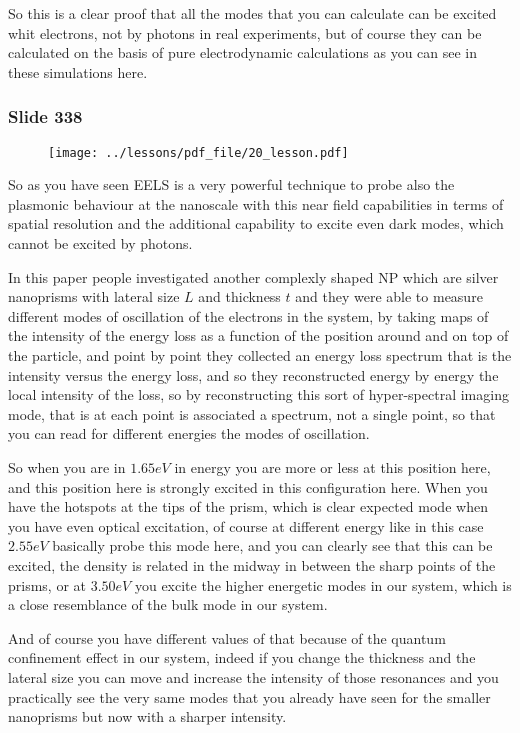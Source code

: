 \documentclass[../main/main.tex]{subfiles}
\begin{document}
So this is a clear proof that all the modes that you can calculate can be excited whit electrons, not by photons in real experiments, but of course they can be calculated on the basis of pure electrodynamic calculations as you can see in these simulations here.

\newpage

\subsubsection{Slide 338}

\begin{figure}[h!]
\centering
\texttt{[image: ../lessons/pdf\_file/20\_lesson.pdf]}
\end{figure}

So as you have seen EELS is a very powerful technique to probe also the plasmonic behaviour at the nanoscale with this near field capabilities in terms of spatial resolution and the additional capability to excite even dark modes, which cannot be excited by photons. 

In this paper people investigated another complexly shaped NP which are silver nanoprisms with lateral size $L$ and thickness $t$ and they were able to measure different modes of oscillation of the electrons in the system, by taking maps of the intensity of the energy loss as a function of the position around and on top of the particle, and point by point they collected an energy loss spectrum that is the intensity versus the energy loss, and so they reconstructed energy by energy the local intensity of the loss, so by reconstructing this sort of hyper-spectral imaging mode, that is at each point is associated a spectrum, not a single point, so that you can read for different energies the modes of oscillation.

So when you are in $1.65 eV$ in energy you are more or less at this position here, and this position here is strongly excited in this configuration here. When you have the hotspots at the tips of the prism, which is clear expected mode when you have even optical excitation, of course at different energy like in this case $2.55 eV$ basically probe this mode here, and you can clearly see that this can be excited, the density is related in the midway in between the sharp points of the prisms, or at $3.50 eV$ you excite the higher energetic modes in our system, which is a close resemblance of the bulk mode in our system.

And of course you have different values of that because of the quantum confinement effect in our system, indeed if you change the thickness and the lateral size you can move and increase the intensity of those resonances and you practically see the very same modes that you already have seen for the smaller nanoprisms but now with a sharper intensity.
\end{document}

